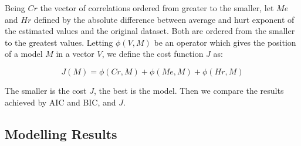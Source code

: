 Being $Cr$ the vector of correlations ordered from greater to the smaller, let $Me$ and $Hr$ defined by the absolute difference between average and hurt exponent of the estimated values and the original dataset. Both are ordered from the smaller to the greatest values. Letting $\phi(V, M)$ be an operator which gives the position of a model $M$ in a vector $V$, we define the cost function $J$ as:


\begin{equation}
J(M) = \phi(Cr, M) + \phi(Me, M) + \phi(Hr, M)
\end{equation}

The smaller is the cost $J$, the best is the model. Then we compare the results achieved by AIC and BIC, and $J$.

\subsection{Modelling Results}

